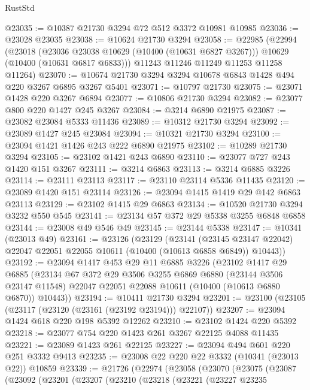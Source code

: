 \begin{lexlean}{RustStd}
\begin{coremodule}
{\begin{coremodule}
{{{{{{{{{{{{{{{{{{{{{{{{{@23035 := @10387 @21730 @3294 @72 @512 @3372 @10981 @10985
@23036 := @23028 @23035
@23038 := @10624 @21730 @3294
@23058 := @22985
    (@22994
      (@23018
        (@23036 @23038 @10629 (@10400 (@10631 @6827 @3267)))
        @10629
        (@10400 (@10631 @6817 @6833)))
      @11243
      @11246
      @11249
      @11253
      @11258
      @11264)
@23070 := @10674 @21730 @3294 @3294 @10678 @6843 @1428 @494 @220 @3267 @6895 @3267 @5401
@23071 := @10797 @21730
@23075 := @23071 @1428 @220 @3267 @6894
@23077 := @10806 @21730 @3294
@23082 := @23077 @800 @220 @1427 @245 @3267
@23084 := @3214 @6890 @21975
@23087 := @23082 @23084 @5333 @11436
@23089 := @10312 @21730 @3294
@23092 := @23089 @1427 @245 @23084
@23094 := @10321 @21730 @3294
@23100 := @23094 @1421 @1426 @243 @222 @6890 @21975
@23102 := @10289 @21730 @3294
@23105 := @23102 @1421 @243 @6890
@23110 := @23077 @727 @243 @1420 @151 @3267
@23111 := @3214 @6863
@23113 := @3214 @6885 @3226
@23114 := @23111 @23113
@23117 := @23110 @23114 @5336 @11435
@23120 := @23089 @1420 @151 @23114
@23126 := @23094 @1415 @1419 @29 @142 @6863 @23113
@23129 := @23102 @1415 @29 @6863
@23134 := @10520 @21730 @3294 @3232 @550 @545
@23141 := @23134 @57 @372 @29 @5338 @3255 @6848 @6858
@23144 := @23008 @49 @546 @49
@23145 := @23144 @5338
@23147 := @10341 (@23013 @49)
@23161 := @23126
    (@23129
      (@23141
        (@23145 @23147 @22042)
        @22047
        @22051
        @22055
        @10611
        (@10400 (@10613 @6858 @6849))
        @10443))
@23192 := @23094
    @1417
    @453
    @29
    @11
    @6885
    @3226
    (@23102
      @1417
      @29
      @6885
      (@23134
        @67
        @372
        @29
        @3506
        @3255
        @6869
        @6880
        (@23144 @3506 @23147 @11548)
        @22047
        @22051
        @22088
        @10611
        (@10400 (@10613 @6880 @6870))
        @10443))
@23194 := @10411 @21730 @3294
@23201 := @23100 (@23105 (@23117 (@23120 (@23161 (@23192 @23194))) @22107))
@23207 := @23094 @1424 @618 @220 @198 @5392 @12262
@23210 := @23102 @1424 @220 @5392
@23218 := @23077 @754 @220 @1423 @261 @3267 @22125 @4088 @11435
@23221 := @23089 @1423 @261 @22125
@23227 := @23094 @494 @601 @220 @251 @3332 @9413
@23235 := @23008 @22 @220 @22 @3332 (@10341 (@23013 @22)) @10859
@23339 := @21726
    (@22974
      (@23058
        (@23070
          (@23075
            (@23087
              (@23092
                (@23201
                  (@23207
                    (@23210
                      (@23218
                        (@23221
                          (@23227
                            @23235
}}}}}}}}}}}}}}}}}}}}}}}}}
\end{coremodule}}
\end{coremodule}
\end{lexlean}
